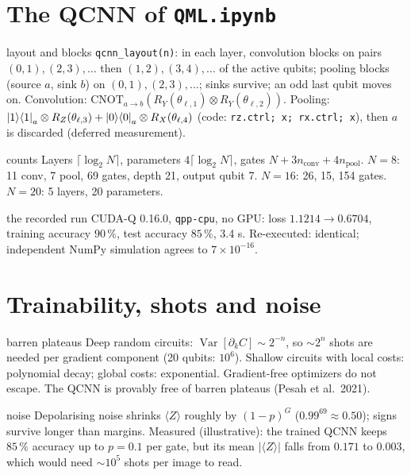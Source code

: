 \documentclass[11pt,a4paper,openany]{book}
\newcounter{wex}[chapter]
\begin{document}
\section{The QCNN of \texttt{QML.ipynb}}
\begin{defn}{layout and blocks}
\texttt{qcnn\_layout(n)}: in each layer, convolution blocks on pairs $(0,1), (2,3), \dots$ then $(1,2), (3,4), \dots$ of the active qubits; pooling
blocks (source $a$, sink $b$) on $(0,1), (2,3), \dots$; sinks survive; an odd last qubit moves on. Convolution:
$\mathrm{CNOT}_{a\to b}(R_Y(\theta_{\ell,1})\otimes R_Y(\theta_{\ell,2}))$. Pooling: $\ket1\!\bra1_a\otimes R_Z(\theta_{\ell,3}) + \ket0\!\bra0_a\otimes R_X(\theta_{\ell,4})$
(code: \texttt{rz.ctrl; x; rx.ctrl; x}), then $a$ is discarded (deferred measurement).
\end{defn}
\begin{keyres}{counts}
Layers $\lceil\log_2N\rceil$, parameters $4\lceil\log_2N\rceil$, gates $N + 3n_{\text{conv}} + 4n_{\text{pool}}$.
$N = 8$: 11 conv, 7 pool, 69 gates, depth 21, output qubit 7. $N = 16$: 26, 15, 154 gates. $N = 20$: 5 layers, 20 parameters.
\end{keyres}
\begin{wexample}{the recorded run}
CUDA-Q 0.16.0, \texttt{qpp-cpu}, no GPU: loss $1.1214 \to 0.6704$, training accuracy $90\,\%$, test accuracy $85\,\%$, 3.4 s. Re-executed:
identical; independent NumPy simulation agrees to $7\times10^{-16}$.
\end{wexample}

\section{Trainability, shots and noise}
\begin{keyres}{barren plateaus}
Deep random circuits: $\operatorname{Var}[\partial_kC] \sim 2^{-n}$, so $\sim2^n$ shots are needed per gradient component (20 qubits: $10^6$).
Shallow circuits with local costs: polynomial decay; global costs: exponential. Gradient-free optimizers do not escape.
The QCNN is provably free of barren plateaus (Pesah et al.\ 2021).
\end{keyres}
\begin{keyres}{noise}
Depolarising noise shrinks $\langle Z\rangle$ roughly by $(1 - p)^G$ ($0.99^{69} \approx 0.50$); signs survive longer than margins.
Measured (illustrative): the trained QCNN keeps $85\,\%$ accuracy up to $p = 0.1$ per gate, but its mean $|\langle Z\rangle|$ falls from
$0.171$ to $0.003$, which would need $\sim10^5$ shots per image to read.
\end{keyres}
\end{document}
